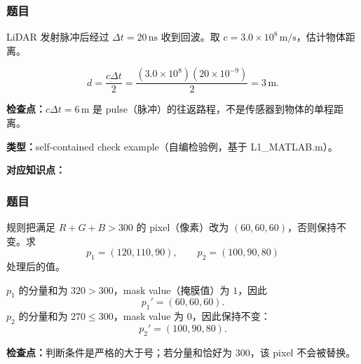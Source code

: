 \subsubsection*{题目}

LiDAR 发射脉冲后经过 $\Delta t=20\,\mathrm{ns}$ 收到回波。取 $c=3.0\times10^8\,\mathrm{m/s}$，估计物体距离。

\begin{checkedsolution}
\[
  d=\frac{c\Delta t}{2}
  =\frac{(3.0\times10^8)(20\times10^{-9})}{2}
  =\boxed{3\,\mathrm m}.
\]
\end{checkedsolution}

\textbf{检查点：}$c\Delta t=6\,\mathrm m$ 是 pulse（脉冲）的往返路程，不是传感器到物体的单程距离。


\textbf{类型：}self-contained check example（自编检验例，基于 L1\_MATLAB.m）。

\textbf{对应知识点：}

\subsubsection*{题目}

规则把满足 $R+G+B>300$ 的 pixel（像素）改为 $(60,60,60)$，否则保持不变。求
\[
  p_1=(120,110,90),
  \qquad
  p_2=(100,90,80)
\]
处理后的值。

\begin{checkedsolution}
$p_1$ 的分量和为 $320>300$，mask value（掩膜值）为 $1$，因此
\[
  \boxed{p_1'=(60,60,60)}.
\]
$p_2$ 的分量和为 $270\le300$，mask value 为 $0$，因此保持不变：
\[
  \boxed{p_2'=(100,90,80)}.
\]
\end{checkedsolution}

\textbf{检查点：}判断条件是严格的大于号；若分量和恰好为 $300$，该 pixel 不会被替换。
